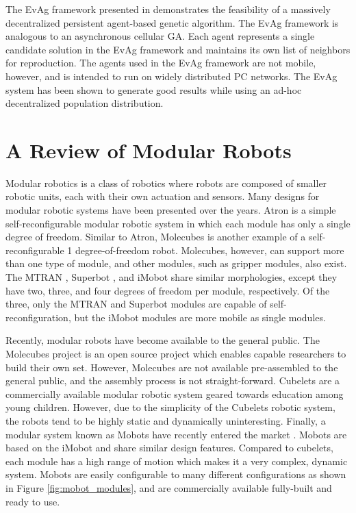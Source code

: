     The EvAg framework presented in \cite{Laredo2010} demonstrates the feasibility
      of a massively decentralized persistent agent-based genetic algorithm. 
    The EvAg framework is analogous to an asynchronous cellular GA. 
    Each agent represents a single candidate solution in the EvAg framework and
      maintains its own list of neighbors for reproduction.  
    The agents used in the EvAg framework are not mobile, however, and is
      intended to run on widely distributed PC networks. 
    The EvAg system has been shown to generate good results while using an ad-hoc
      decentralized population distribution.

  \section{A Review of Modular Robots} %

    Modular robotics is a class of robotics where robots are composed of smaller
      robotic units, each with their own actuation and sensors. 
    Many designs for modular robotic systems have been presented over the years. 
    Atron \cite{Jorgensen2004, Christensen2006} is a simple self-reconfigurable
      modular robotic system in which each module has only a single degree of
      freedom.
    Similar to Atron, Molecubes \cite{Zykov2007} is another example of a
    self-reconfigurable 1 degree-of-freedom robot. 
    Molecubes, however, can support more than one type of module, and other
      modules, such as gripper modules, also exist. 
    The MTRAN \cite{Murata2002}, Superbot \cite{Shen2006, Salemi2006}, and iMobot
      \cite{Ryland2010} share similar morphologies, except they have two, three, and
      four degrees of freedom per module, respectively. 
    Of the three, only the MTRAN and Superbot modules are capable of
      self-reconfiguration, but the iMobot modules are more mobile as single
      modules. 

    Recently, modular robots have become available to the general public. 
    The Molecubes project is an open source project which enables capable researchers
      to build their own set. 
    However, Molecubes are not available pre-assembled to the general public,
      and the assembly process is not straight-forward. 
    Cubelets \cite{cubelets_website} are a commercially available modular robotic system
      geared towards education among young children. 
    However, due to the simplicity of the Cubelets robotic system, the robots
      tend to be highly static and dynamically uninteresting. 
    Finally, a modular system known as Mobots have recently entered the market
    \cite{barobo_website}. Mobots are based on the
      iMobot\cite{Ryland2010} and share similar design features. 
    Compared to cubelets, each module has a high range of motion which makes it
      a very complex, dynamic system. 
    Mobots are easily configurable to many different configurations as shown in
      Figure \ref{fig:mobot_modules}, and are commercially available
      fully-built and ready to use.

